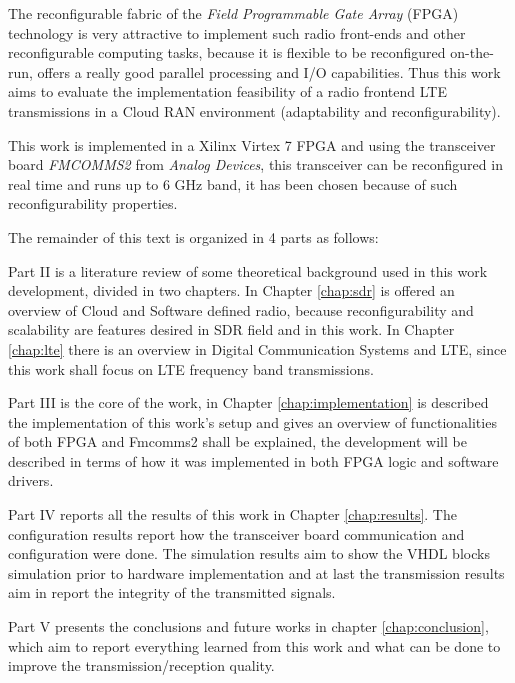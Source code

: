 The reconfigurable fabric of the \textit{Field Programmable Gate Array} (FPGA)
technology is very attractive to implement such radio front-ends and other
reconfigurable computing tasks, because it is flexible to be reconfigured
on-the-run, offers a really good parallel processing and I/O capabilities. Thus
this work aims to evaluate the implementation feasibility of a radio frontend
LTE transmissions in a Cloud RAN environment (adaptability and
reconfigurability).

This work is implemented in a Xilinx Virtex 7 FPGA and using the transceiver
board \textit{FMCOMMS2} from \textit{Analog Devices}, this transceiver can be
reconfigured in real time and runs up to 6 GHz band, it has been chosen because
of such reconfigurability properties.

The remainder of this text is organized in 4 parts as follows:

Part II is a literature review of some theoretical background used in
this work development, divided in two chapters. In Chapter \ref{chap:sdr} is
offered an overview of Cloud and Software defined radio, because
reconfigurability and scalability are features desired in SDR field and in this
work. In Chapter \ref{chap:lte} there is an overview in Digital Communication
Systems and LTE, since this work shall focus on LTE  frequency band
transmissions.

Part III is the core of the work, in Chapter \ref{chap:implementation} is
described the implementation of this work's setup and gives an overview of
functionalities of both FPGA and Fmcomms2 shall be explained, the
development will be described in terms of how it was implemented in both FPGA
logic and software drivers.

Part IV reports all the results of this work in Chapter
\ref{chap:results}. The configuration results report how the transceiver board
communication and configuration were done. The simulation results aim to show
the VHDL blocks simulation prior to hardware implementation and at last the
transmission results aim in report the integrity of the transmitted signals.

Part V presents the conclusions and future works in chapter
\ref{chap:conclusion}, which aim to report everything learned from this work and
what can be done to improve the transmission/reception quality.
